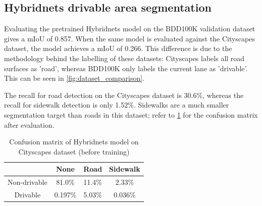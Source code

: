 \subsection{Hybridnets drivable area segmentation}
Evaluating the pretrained Hybridnets model on the BDD100K validation dataset gives a mIoU
of 0.857. When the same model is evaluated against the Cityscapes dataset,
the model achieves a mIoU of 0.266. This difference is due to the methodology behind
the labelling of these datasets: Cityscapes labels all road surfaces as 'road',
whereas BDD100K only labels the current lane as 'drivable'. This can be seen in \cref{fig:dataset_comparison}.

The recall for road detection on the Cityscapes dataset is 30.6\%, whereas the recall for
sidewalk detection is only 1.52\%. Sidewalks are a much smaller segmentation target than
roads in this dataset; refer to \cref{table:pretrained_confusion_matrix} for the
confusion matrix after evaluation.

\begin{table}[H]
    \centering
    \begin{tabular}{|c|c c c}
    \toprule
    & None & Road & Sidewalk \\
    \midrule
    Non-drivable & 81.0\% & 11.4\% & 2.33\% \\
    Drivable & 0.197\% & 5.03\% & 0.036\% \\
    \bottomrule
    \end{tabular}
    \caption{Confusion matrix of Hybridnets model on Cityscapes dataset (before training)}
    \label{table:pretrained_confusion_matrix}
\end{table}


